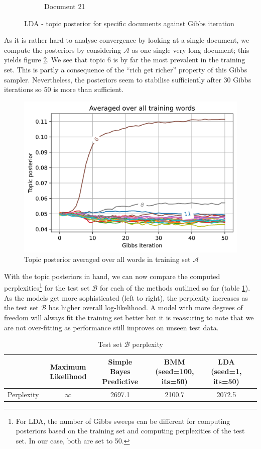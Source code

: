 \documentclass[]{article}
\newcommand{\Acal}{\mathcal{A}}
\newcommand{\Bcal}{\mathcal{B}}
\newcommand{\figwidth}{0.4\linewidth}
\begin{document}
\begin{figure}[!h]
\begin{subfigure}{0.33\linewidth}
		\caption{Document 21}	
	\end{subfigure}
	\caption{LDA - topic posterior for specific documents against Gibbs iteration}
	\label{fig:lda-post-per-doc}
\end{figure}

As it is rather hard to analyse convergence by looking at a single document, we compute the posteriors by considering $\Acal$ as one single very long document; this yields figure \ref{fig:lda-post-av}. We see that topic 6 is by far the most prevalent in the training set. This is partly a consequence of the ``rich get richer'' property of this Gibbs sampler. Nevertheless, the posteriors seem to stabilise sufficiently after 30 Gibbs iterations so 50 is more than sufficient.
%
\begin{figure}[!h]
	\centering
	\includegraphics[width=\figwidth]{lda-topic-post-average.png}
	\caption{Topic posterior averaged over all words in training set $\Acal$}
	\label{fig:lda-post-av}
\end{figure}

With the topic posteriors in hand, we can now compare the computed perplexities\footnote{For LDA, the number of Gibbs sweeps can be different for computing posteriors based on the training set and computing perplexities of the test set. In our case, both are set to 50.} for the test set $\Bcal$ for each of the methods outlined so far (table \ref{tab:perplex-comp}). As the models get more sophisticated (left to right), the perplexity increases as the test set $\Bcal$ has higher overall log-likelihood. A model with more degrees of freedom will always fit the training set better but it is reassuring to note that we are not over-fitting as performance still improves on unseen test data.
%
\begin{table}[!h]
	\centering
	\begin{tabular}{c | c c c c c}
		& Maximum Likelihood & Simple Bayes Predictive & BMM (seed=100, its=50) & LDA (seed=1, its=50) \\ \hline
		Perplexity & $\infty$ & 2697.1 & 2100.7 & 2072.5 
	\end{tabular}
\caption{Test set $\Bcal$ perplexity}
\label{tab:perplex-comp}
\end{table}
\end{document}
